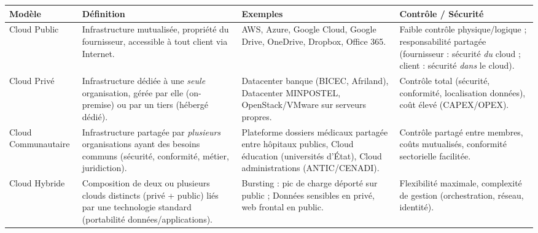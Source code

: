 \documentclass[11pt]{article}
\newcommand{\cle}[1]{{\popxbold\color{popdark}#1}}
\begin{document}
\begin{propriete}
\begin{center}
\begin{tabularx}{\linewidth}{|l|X|X|X|}
\hline
\rowcolor{popblueL}
\textbf{Modèle} & \textbf{Définition} & \textbf{Exemples} & \textbf{Contrôle / Sécurité} \\
\hline
\cle{Cloud Public} & Infrastructure mutualisée, propriété du fournisseur, accessible à tout client via Internet. & AWS, Azure, Google Cloud, Google Drive, OneDrive, Dropbox, Office 365. & Faible contrôle physique/logique ; responsabilité partagée (fournisseur : sécurité \emph{du} cloud ; client : sécurité \emph{dans} le cloud). \\
\cle{Cloud Privé} & Infrastructure dédiée à une \emph{seule} organisation, gérée par elle (on-premise) ou par un tiers (hébergé dédié). & Datacenter banque (BICEC, Afriland), Datacenter MINPOSTEL, OpenStack/VMware sur serveurs propres. & Contrôle total (sécurité, conformité, localisation données), coût élevé (CAPEX/OPEX). \\
\cle{Cloud Communautaire} & Infrastructure partagée par \emph{plusieurs} organisations ayant des besoins communs (sécurité, conformité, métier, juridiction). & Plateforme dossiers médicaux partagée entre hôpitaux publics, Cloud éducation (universités d'État), Cloud administrations (ANTIC/CENADI). & Contrôle partagé entre membres, coûts mutualisés, conformité sectorielle facilitée. \\
\cle{Cloud Hybride} & Composition de deux ou plusieurs clouds distincts (privé + public) liés par une technologie standard (portabilité données/applications). & Bursting : pic de charge déporté sur public ; Données sensibles en privé, web frontal en public. & Flexibilité maximale, complexité de gestion (orchestration, réseau, identité). \\
\hline
\end{tabularx}
\end{center}
\end{propriete}
\end{document}

